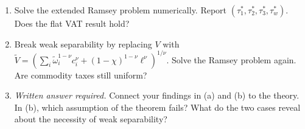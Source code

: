 \begin{enumerate}[label=(\alph*)]
    \item Solve the extended Ramsey problem numerically. Report $(\tau_1^*, \tau_2^*, \tau_3^*, \tau_w^*)$. Does the flat VAT result hold?
 
    \item Break weak separability by replacing $V$ with $\tilde{V} = \left( \sum_i \tilde{\omega}_i^{1-\nu} c_i^\nu + (1-\chi)^{1-\nu} \ell^\nu \right)^{1/\nu}$. Solve the Ramsey problem again. Are commodity taxes still uniform?
 
    \item \emph{Written answer required.} Connect your findings in (a) and (b) to the theory. In (b), which assumption of the theorem fails? What do the two cases reveal about the necessity of weak separability?
\end{enumerate}
 
 